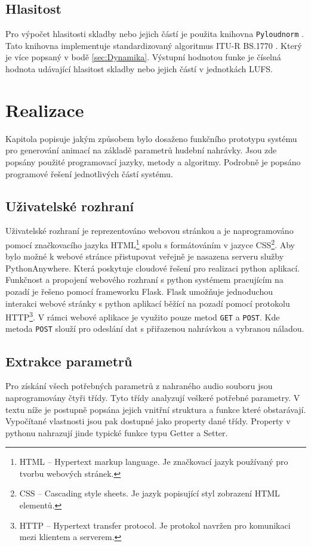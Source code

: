 \subsection{Hlasitost} \label{sec:Pyloudnorm}
Pro výpočet hlasitosti skladby nebo jejich částí je použita knihovna \texttt{Pyloudnorm} \cite{Pyloudnorm}. Tato knihovna implementuje standardizovaný algoritmus ITU-R BS.1770 \cite{BS.1770}. Který je více popsaný v bodě \ref{sec:Dynamika}. Výstupní hodnotou funke je číselná hodnota udávající hlasitost skladby nebo jejich částí v jednotkách LUFS. 

\section{Realizace} \label{sec:Realizace}

Kapitola popisuje jakým způsobem bylo dosaženo funkčního prototypu systému pro generování animací na základě parametrů hudební nahrávky. Jsou zde popsány použité programovací jazyky, metody a algoritmy. Podrobně je popsáno programové řešení jednotlivých částí systému. 

\subsection{Uživatelské rozhraní}

Uživatelské rozhraní je reprezentováno webovou stránkou a je naprogramováno pomocí značkovacího jazyka \acs{HTML}\footnote{HTML -- Hypertext markup language. Je značkovací jazyk používaný pro tvorbu webových stránek.} spolu s formátováním v jazyce \acs{CSS}\footnote{CSS -- Cascading style sheets. Je jazyk popisující styl zobrazení HTML elementů\cite{CSS}.}. Aby bylo možné k webové stránce přistupovat veřejně je nasazena serveru služby PythonAnywhere. Která poskytuje cloudové řešení pro realizaci python aplikací. Funkčnost a propojení webového rozhraní s python systémem pracujícím na pozadí je řešeno pomocí frameworku Flask. Flask umožňuje jednoduchou interakci webové stránky s python aplikací běžící na pozadí pomocí protokolu HTTP\footnote{HTTP -- Hypertext transfer protocol. Je protokol navržen pro komunikaci mezi klientem a serverem.}. V rámci webové aplikace je využito pouze metod \texttt{GET} a \texttt{POST}. Kde metoda \texttt{POST} slouží pro odeslání dat s přiřazenou nahrávkou a vybranou náladou.

\subsection{Extrakce parametrů} \label{sec:Parameter_extraction}
Pro získání všech potřebných parametrů z nahraného audio souboru jsou naprogramovány čtyři třídy. Tyto třídy analyzují veškeré potřebné parametry. V textu níže je postupně popsána jejich vnitřní struktura a funkce které obstarávají. Vypočítané vlastnosti jsou pak dostupné jako property dané třídy. Property v pythonu nahrazují jinde typické funkce typu Getter a Setter.

